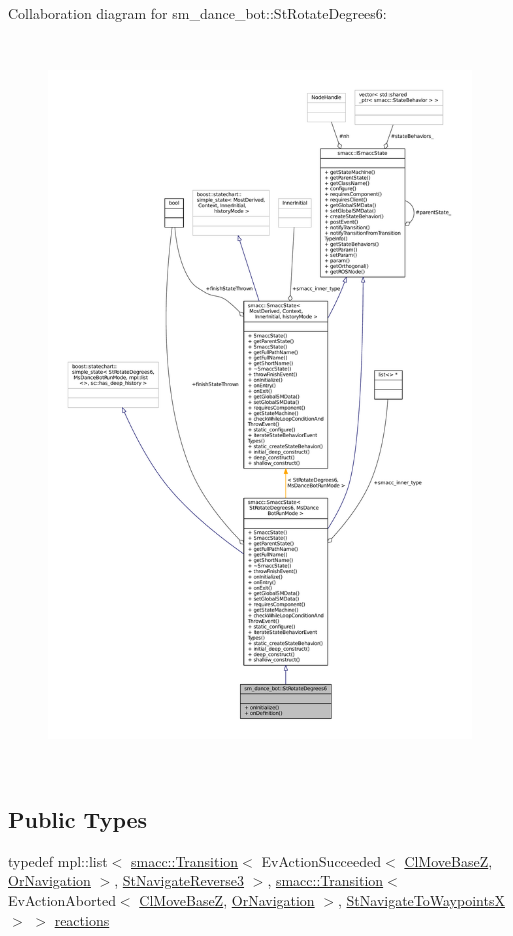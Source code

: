 Collaboration diagram for sm\+\_\+dance\+\_\+bot\+:\+:St\+Rotate\+Degrees6\+:
\nopagebreak
\begin{figure}[H]
\begin{center}
\leavevmode
\includegraphics[height=550pt]{structsm__dance__bot_1_1StRotateDegrees6__coll__graph}
\end{center}
\end{figure}
\subsection*{Public Types}
\begin{DoxyCompactItemize}
\item 
typedef mpl\+::list$<$ \hyperlink{classsmacc_1_1Transition}{smacc\+::\+Transition}$<$ Ev\+Action\+Succeeded$<$ \hyperlink{classmove__base__z__client_1_1ClMoveBaseZ}{Cl\+Move\+BaseZ}, \hyperlink{classsm__dance__bot_1_1OrNavigation}{Or\+Navigation} $>$, \hyperlink{structsm__dance__bot_1_1StNavigateReverse3}{St\+Navigate\+Reverse3} $>$, \hyperlink{classsmacc_1_1Transition}{smacc\+::\+Transition}$<$ Ev\+Action\+Aborted$<$ \hyperlink{classmove__base__z__client_1_1ClMoveBaseZ}{Cl\+Move\+BaseZ}, \hyperlink{classsm__dance__bot_1_1OrNavigation}{Or\+Navigation} $>$, \hyperlink{structsm__dance__bot_1_1StNavigateToWaypointsX}{St\+Navigate\+To\+WaypointsX} $>$ $>$ \hyperlink{structsm__dance__bot_1_1StRotateDegrees6_a103f6ea78ff4293a2d2c1086a391355d}{reactions}
\end{DoxyCompactItemize}
